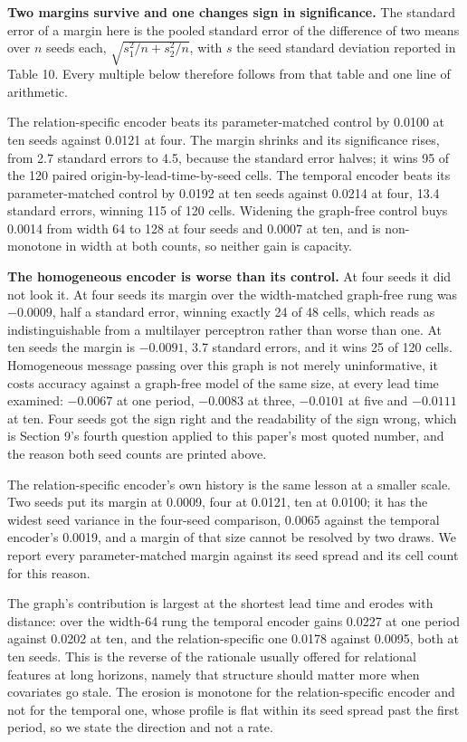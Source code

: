\documentclass[twoside,11pt]{article}
\begin{document}
\textbf{Two margins survive and one changes sign in significance.} The standard error of a margin here is the pooled standard error of the difference of two means over \(n\) seeds each, \(\sqrt{s_{1}^{2}/n + s_{2}^{2}/n}\), with \(s\) the seed standard deviation reported in Table 10. Every multiple below therefore follows from that table and one line of arithmetic.

The relation-specific encoder beats its parameter-matched control by 0.0100 at ten seeds against 0.0121 at four. The margin shrinks and its significance rises, from 2.7 standard errors to 4.5, because the standard error halves; it wins 95 of the 120 paired origin-by-lead-time-by-seed cells. The temporal encoder beats its parameter-matched control by 0.0192 at ten seeds against 0.0214 at four, 13.4 standard errors, winning 115 of 120 cells. Widening the graph-free control buys 0.0014 from width 64 to 128 at four seeds and 0.0007 at ten, and is non-monotone in width at both counts, so neither gain is capacity.

\textbf{The homogeneous encoder is worse than its control.} At four seeds it did not look it. At four seeds its margin over the width-matched graph-free rung was \(- 0.0009\), half a standard error, winning exactly 24 of 48 cells, which reads as indistinguishable from a multilayer perceptron rather than worse than one. At ten seeds the margin is \(- 0.0091\), 3.7 standard errors, and it wins 25 of 120 cells. Homogeneous message passing over this graph is not merely uninformative, it costs accuracy against a graph-free model of the same size, at every lead time examined: \(- 0.0067\) at one period, \(- 0.0083\) at three, \(- 0.0101\) at five and \(- 0.0111\) at ten. Four seeds got the sign right and the readability of the sign wrong, which is Section 9's fourth question applied to this paper's most quoted number, and the reason both seed counts are printed above.

The relation-specific encoder's own history is the same lesson at a smaller scale. Two seeds put its margin at 0.0009, four at 0.0121, ten at 0.0100; it has the widest seed variance in the four-seed comparison, 0.0065 against the temporal encoder's 0.0019, and a margin of that size cannot be resolved by two draws. We report every parameter-matched margin against its seed spread and its cell count for this reason.

The graph's contribution is largest at the shortest lead time and erodes with distance: over the width-64 rung the temporal encoder gains 0.0227 at one period against 0.0202 at ten, and the relation-specific one 0.0178 against 0.0095, both at ten seeds. This is the reverse of the rationale usually offered for relational features at long horizons, namely that structure should matter more when covariates go stale. The erosion is monotone for the relation-specific encoder and not for the temporal one, whose profile is flat within its seed spread past the first period, so we state the direction and not a rate.
\end{document}
